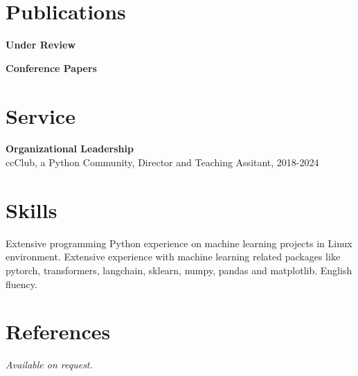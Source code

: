 \documentclass{article}
\begin{document}
\setlength{\leftmargini}{0em}
\section{Publications}
\vspace{\baselineskip}
\noindent\textbf{Under Review}\\
\begin{verse}
\end{verse}
\vspace{\baselineskip}
\noindent\textbf{Conference Papers}\\
\begin{verse}
\end{verse}
\begin{verse}
\end{verse}
\begin{verse}
\end{verse}
\vspace{1em}
\section{Service}
\noindent\textbf{Organizational Leadership}\\
ccClub, a Python Community, Director and Teaching Assitant, 2018-2024\\






\section{Skills}\noindent Extensive programming Python experience on machine learning projects in Linux environment. Extensive experience with machine learning related packages like pytorch, transformers, langchain, sklearn, numpy, pandas and matplotlib. English fluency.



\section{References}\noindent \emph{Available on request.}

\end{document}

